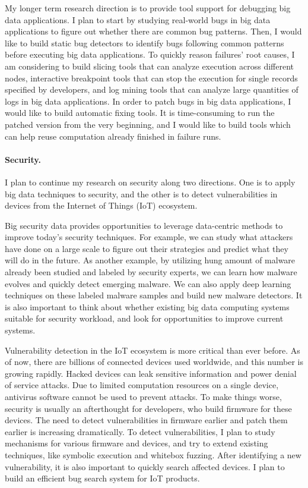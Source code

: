 \documentclass[10pt]{article}
\begin{document}
My longer term research direction is to provide tool support for debugging big data applications.
I plan to start by studying real-world bugs in big data applications to figure out whether there are common bug patterns. 
Then, I would like to build static bug detectors to identify bugs following common patterns before executing big data applications.  
To quickly reason failures' root causes, I am considering to build slicing tools that can analyze execution across different nodes, 
interactive breakpoint tools that can stop the execution for single records specified by developers,
and log mining tools that can analyze large quantities of logs in big data applications.
In order to patch bugs in big data applications, I would like to build automatic fixing tools. 
It is time-consuming to run the patched version from the very beginning, 
and I would like to build tools which can help reuse computation already finished in failure runs. 


\vspace{-.1in}
\paragraph{Security.} 

I plan to continue my research on security along two directions. 
One is to apply big data techniques to security, 
and the other is to detect vulnerabilities in devices from the Internet of Things (IoT) ecosystem.

Big security data provides opportunities to leverage data-centric methods to improve today's security techniques. 
For example, we can study what attackers have done on a large scale to figure out their strategies and predict what they will do in the future. 
As another example, by utilizing hung amount of malware already been studied and labeled by security experts, 
we can learn how malware evolves and quickly detect emerging malware. 
We can also apply deep learning techniques on these labeled malware samples and build new malware detectors. 
It is also important to think about whether existing big data computing systems suitable for security workload, 
and look for opportunities to improve current systems.

Vulnerability detection in the IoT ecosystem is more critical than ever before.
As of now, there are billions of connected devices used worldwide, 
and this number is growing rapidly.  
Hacked devices can leak sensitive information and power denial of service attacks. 
Due to limited computation resources on a single device, 
antivirus software cannot be used to prevent attacks. 
To make things worse, security is usually an afterthought for developers, who build firmware for these devices. 
The need to detect vulnerabilities in firmware earlier and patch them earlier is increasing dramatically. 
To detect vulnerabilities, I plan to study mechanisms for various firmware and devices, 
and try to extend existing techniques, like symbolic execution and whitebox fuzzing. 
After identifying a new vulnerability, it is also important to quickly search affected devices. 
I plan to build an efficient bug search system for IoT products.  


\newpage


\end{document}
